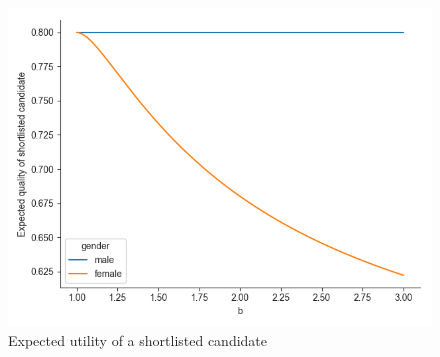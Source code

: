 \documentclass[11pt]{article}
\begin{document}
\begin{figure}[H] %
    \centering
    \caption{Expected utility of a shortlisted candidate}
    \includegraphics[width=\textwidth, keepaspectratio]{plots/expected_quality_shortlist.png}
\end{figure}
\end{document}
